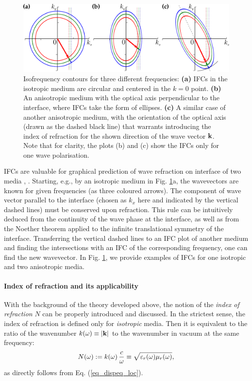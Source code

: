 \begin{figure}[ht] \caption{Isofrequency contours for three different frequencies: \textbf{(a)} IFCs in the isotropic medium are circular and centered in the $k=0$ point. \textbf{(b)} An anisotropic medium with the optical axis perpendicular to the interface, where IFCs take the form of ellipses. \textbf{(c)} A similar case of another anisotropic medium, with the orientation of the optical axis (drawn as the dashed black line) that warrants introducing the index of refraction for the shown direction of the wave vector ${\mathbf{k}}$. Note that for clarity, the plots (b) and (c) show the IFCs only for one wave polarisation. %
} \label{fg_ifc} \centering
	\includegraphics[width=.8\textwidth]{img/ifc_freqdispersion.pdf} 
\end{figure}
IFCs are valuable for graphical prediction of wave refraction on interface of two media \cite[p. 118]{shalaev2010book}, \cite{boardman2005negative}. Starting, e.g., by an isotropic medium in Fig. \ref{fg_ifc}a, the wavevectors are known for given frequencies (as three coloured arrows).
The component of wave vector parallel to the interface (chosen as $k_x$ here and indicated by the vertical dashed lines) must be conserved upon refraction. This rule can be intuitively deduced from the continuity of the wave phase at the interface, as well as from the Noether theorem applied to the infinite translational symmetry of the interface. Transferring the vertical dashed lines to an IFC plot of another medium and finding the intersections with an IFC of the corresponding frequency, one can find the new wavevector. 
In Fig. \ref{fg_ifc}, we provide examples of IFCs for one isotropic and two anisotropic media.

\paragraph{Index of refraction and its applicability}  %
\label{indexofrefraction}
With the background of the theory developed above, the notion of the \textit{index of refraction} $N$ can be properly introduced and discussed. 
In the strictest sense, the index of refraction is defined only for \textit{isotropic} media. Then it is equivalent to the ratio of the wavenumber $k(\omega) \equiv |{\mathbf{k}}|$ to the wavenumber in vacuum at the same frequency: 
\begin{equation} N(\omega) := k(\omega) \, \frac{c}{\omega} \equiv \sqrt{\varepsilon_r(\omega)\mu_r(\omega)}, \label{eq_dispeqN}\end{equation}
as directly follows from Eq. (\ref{eq_dispeq_loc}).

